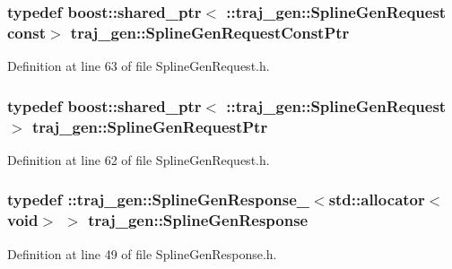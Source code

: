 \subsubsection[{\texorpdfstring{Spline\+Gen\+Request\+Const\+Ptr}{SplineGenRequestConstPtr}}]{\setlength{\rightskip}{0pt plus 5cm}typedef boost\+::shared\+\_\+ptr$<$ \+::{\bf traj\+\_\+gen\+::\+Spline\+Gen\+Request} const$>$ {\bf traj\+\_\+gen\+::\+Spline\+Gen\+Request\+Const\+Ptr}}\hypertarget{namespacetraj__gen_ad74fd0e2dacfbba0b3bb66718756c8bb}{}\label{namespacetraj__gen_ad74fd0e2dacfbba0b3bb66718756c8bb}


Definition at line 63 of file Spline\+Gen\+Request.\+h.

\subsubsection[{\texorpdfstring{Spline\+Gen\+Request\+Ptr}{SplineGenRequestPtr}}]{\setlength{\rightskip}{0pt plus 5cm}typedef boost\+::shared\+\_\+ptr$<$ \+::{\bf traj\+\_\+gen\+::\+Spline\+Gen\+Request} $>$ {\bf traj\+\_\+gen\+::\+Spline\+Gen\+Request\+Ptr}}\hypertarget{namespacetraj__gen_adc2f856a76e36b50d0779534c24e40c9}{}\label{namespacetraj__gen_adc2f856a76e36b50d0779534c24e40c9}


Definition at line 62 of file Spline\+Gen\+Request.\+h.

\subsubsection[{\texorpdfstring{Spline\+Gen\+Response}{SplineGenResponse}}]{\setlength{\rightskip}{0pt plus 5cm}typedef \+::{\bf traj\+\_\+gen\+::\+Spline\+Gen\+Response\+\_\+}$<$std\+::allocator$<$void$>$ $>$ {\bf traj\+\_\+gen\+::\+Spline\+Gen\+Response}}\hypertarget{namespacetraj__gen_a96b15a7eb1a4a1209fba2e9d75acb7a4}{}\label{namespacetraj__gen_a96b15a7eb1a4a1209fba2e9d75acb7a4}


Definition at line 49 of file Spline\+Gen\+Response.\+h.

